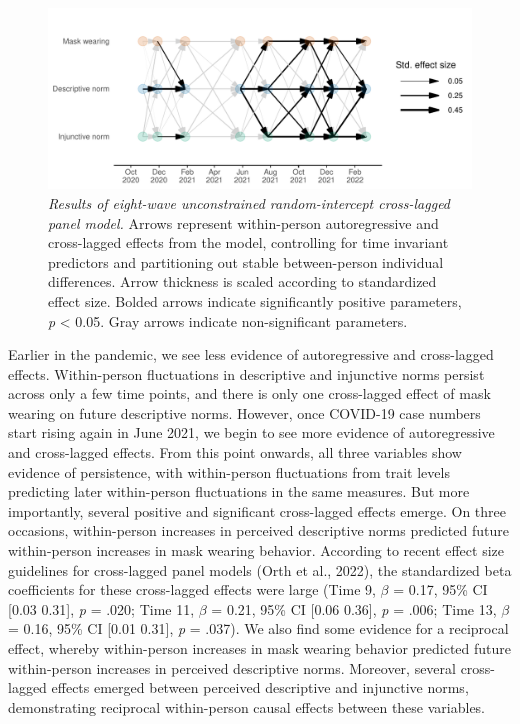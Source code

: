 \documentclass[
  english,
  man,floatsintext]{apa6}
\begin{document}
\begin{figure}
\centering
\includegraphics{manuscript_files/figure-latex/plotRICLPM-1.pdf}
\caption{\label{fig:plotRICLPM}\emph{Results of eight-wave unconstrained random-intercept cross-lagged panel model.} Arrows represent within-person autoregressive and cross-lagged effects from the model, controlling for time invariant predictors and partitioning out stable between-person individual differences. Arrow thickness is scaled according to standardized effect size. Bolded arrows indicate significantly positive parameters, \emph{p} \textless{} 0.05. Gray arrows indicate non-significant parameters.}
\end{figure}

Earlier in the pandemic, we see less evidence of autoregressive and cross-lagged effects. Within-person fluctuations in descriptive and injunctive norms persist across only a few time points, and there is only one cross-lagged effect of mask wearing on future descriptive norms. However, once COVID-19 case numbers start rising again in June 2021, we begin to see more evidence of autoregressive and cross-lagged effects. From this point onwards, all three variables show evidence of persistence, with within-person fluctuations from trait levels predicting later within-person fluctuations in the same measures. But more importantly, several positive and significant cross-lagged effects emerge. On three occasions, within-person increases in perceived descriptive norms predicted future within-person increases in mask wearing behavior. According to recent effect size guidelines for cross-lagged panel models (Orth et al., 2022), the standardized beta coefficients for these cross-lagged effects were large (Time 9, \(\beta\) = 0.17, 95\% CI {[}0.03 0.31{]}, \emph{p} = .020; Time 11, \(\beta\) = 0.21, 95\% CI {[}0.06 0.36{]}, \emph{p} = .006; Time 13, \(\beta\) = 0.16, 95\% CI {[}0.01 0.31{]}, \emph{p} = .037). We also find some evidence for a reciprocal effect, whereby within-person increases in mask wearing behavior predicted future within-person increases in perceived descriptive norms. Moreover, several cross-lagged effects emerged between perceived descriptive and injunctive norms, demonstrating reciprocal within-person causal effects between these variables.
\end{document}
